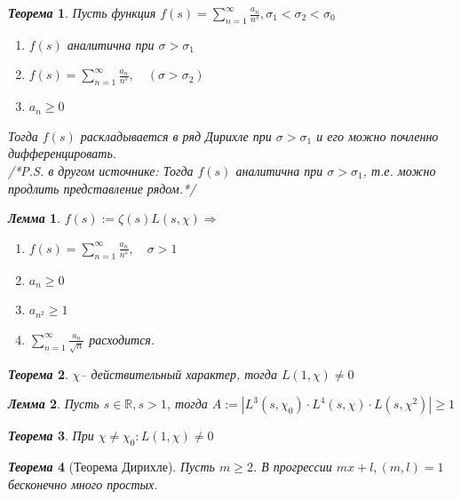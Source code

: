 \documentclass[a4paper,12pt]{article}
\newtheorem{teo2}{\textit{Теорема}}
\newtheorem{lem2}{\textit{Лемма}}
\newcommand{\q}{\quad}
\newcommand{\Ra}{\Rightarrow}
\newcommand{\bb}[1]{\mathbb{#1}}
\newcommand{\SL}{\sum\limits}
\begin{document}
\begin{formbox}{}
\begin{teo2} Пусть функция $f(s) = \SL_{n=1}^\infty \frac{a_n}{n^s}, \sigma_1 <\sigma_2 < \sigma_0 $
\begin{enumerate}
\item $f(s)$ аналитична при $\sigma > \sigma_1$
\item $f(s) = \SL_{n=1}^\infty  \frac{a_n}{n^s},\q(\sigma > \sigma_2) $
\item $a_n \ge 0$
\end{enumerate}
Тогда $f(s)$ раскладывается в ряд Дирихле при $\sigma > \sigma_1$ и его можно почленно дифференцировать. \\
/*P.S. в другом источнике: Тогда $f(s)$ аналитична при $\sigma > \sigma_1$, т.е. можно продлить представление рядом.*/
\end{teo2}
\end{formbox}
\begin{formbox}{}
\begin{lem2} $f(s):= \zeta(s) L(s,\chi) \Ra$
\begin{enumerate}
\item $f(s) = \SL_{n=1}^\infty \frac{a_n}{n^s},\q\sigma > 1 $
\item $a_n \ge 0$
\item $a_{n^2} \ge 1$
\item $\SL_{n=1}^\infty \frac{a_n}{\sqrt{n}} $ расходится.
\end{enumerate}
\end{lem2}
\end{formbox}
\begin{formbox}{}
\begin{teo2} $\chi$-- действительный характер, тогда $L(1, \chi) \not=0$
\end{teo2}
\end{formbox}
\begin{formbox}{}
\begin{lem2} Пусть $s\in \bb{R}, s > 1$, тогда $A:= |L^3(s,\chi_0)\cdot L^4(s,\chi)\cdot L(s, \chi^2)| \ge 1$
\end{lem2}
\end{formbox}
\begin{formbox}{}
\begin{teo2} При $\chi \not= \chi_0: L(1,\chi)\not=0$
\end{teo2}
\end{formbox}
\begin{formbox}{}
\begin{teo2}[Теорема Дирихле] Пусть $m\ge 2$. В прогрессии $mx+l, (m,l) = 1$ бесконечно много простых.
\end{teo2}
\end{formbox}
\end{document}
